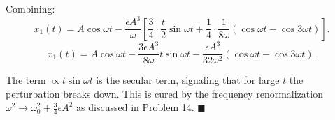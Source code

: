 \documentclass[12pt]{article}
\begin{document}
Combining:
\[
x_1(t) = A\cos\omega t - \frac{\epsilon A^3}{\omega}\left[\frac{3}{4}\cdot\frac{t}{2}\sin\omega t + \frac{1}{4}\cdot\frac{1}{8\omega}(\cos\omega t-\cos 3\omega t)\right].
\]
\[
\boxed{x_1(t) = A\cos\omega t - \frac{3\epsilon A^3}{8\omega}t\sin\omega t - \frac{\epsilon A^3}{32\omega^2}(\cos\omega t-\cos 3\omega t).}
\]

The term $\propto t\sin\omega t$ is the secular term, signaling that for large $t$ the perturbation breaks down. This is cured by the frequency renormalization $\omega^2\to\omega_0^2+\frac{3}{4}\epsilon A^2$ as discussed in Problem 14. $\blacksquare$
\end{document}
